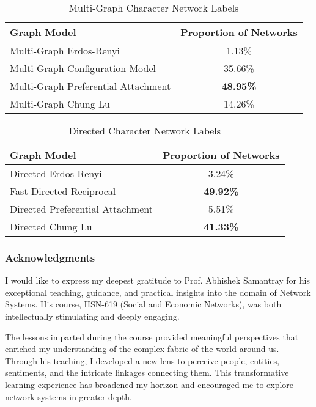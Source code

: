 \documentclass{article} %
\begin{document}
\begin{table}[ht]
\centering
\caption{Multi-Graph Character Network Labels}
\begin{tabular}{|l|c|}
\hline
\textbf{Graph Model}                     & \textbf{Proportion of Networks} \\ \hline
Multi-Graph Erdos-Renyi                  & 1.13\%                          \\ \hline
Multi-Graph Configuration Model          & 35.66\%                         \\ \hline
Multi-Graph Preferential Attachment      & \textbf{48.95\%}                \\ \hline
Multi-Graph Chung Lu                     & 14.26\%                         \\ \hline
\end{tabular}
\end{table}

\begin{table}[htbp]
\centering
\caption{Directed Character Network Labels}
\begin{tabular}{|l|c|}
\hline
\textbf{Graph Model}                     & \textbf{Proportion of Networks} \\ \hline
Directed Erdos-Renyi                  & 3.24\%                          \\ \hline
Fast Directed Reciprocal          & \textbf{49.92\%}                         \\ \hline
Directed Preferential Attachment      & 5.51\%                \\ \hline
Directed Chung Lu                     & \textbf{41.33\%}                        \\ \hline
\end{tabular}
\end{table}

\newpage
\subsubsection*{Acknowledgments}

I would like to express my deepest gratitude to Prof. Abhishek Samantray for his exceptional teaching, guidance, and practical insights into the domain of Network Systems. His course, HSN-619 (Social and Economic Networks), was both intellectually stimulating and deeply engaging.  

The lessons imparted during the course provided meaningful perspectives that enriched my understanding of the complex fabric of the world around us. Through his teaching, I developed a new lens to perceive people, entities, sentiments, and the intricate linkages connecting them. This transformative learning experience has broadened my horizon and encouraged me to explore network systems in greater depth.  
\end{document}

